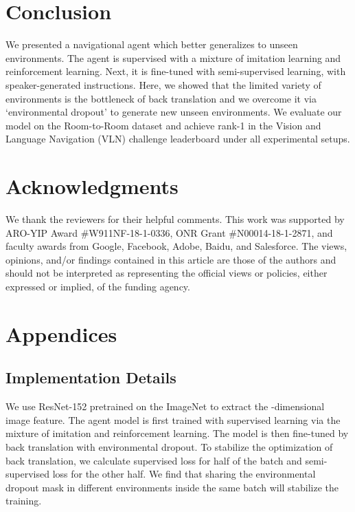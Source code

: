 \documentclass[11pt,a4paper]{article}
\begin{document}
\section{Conclusion}
We presented a navigational agent which better generalizes to unseen environments.
The agent is supervised with a mixture of imitation learning and reinforcement learning.
Next, it is fine-tuned with semi-supervised learning, with speaker-generated instructions. Here, we showed that the limited variety of environments is the bottleneck of back translation and we overcome it via `environmental dropout' to generate new unseen environments.
We evaluate our model on the Room-to-Room dataset and  achieve rank-1 in the Vision and Language Navigation (VLN) challenge leaderboard under all experimental setups. 


\section*{Acknowledgments}
We thank the reviewers for their helpful comments. 
This work was supported by ARO-YIP Award \#W911NF-18-1-0336, ONR Grant \#N00014-18-1-2871, and faculty awards from Google, Facebook, Adobe, Baidu, and Salesforce. The views, opinions, and/or findings contained in this article are those of the authors and should not be interpreted as representing the official views or policies, either expressed or implied, of the funding agency.




\appendix

\section{Appendices}
\subsection{Implementation Details}
We use ResNet-152 \cite{he2016deep} pretrained on the ImageNet \cite{russakovsky2015imagenet} to extract the -dimensional image feature. 
The agent model is first trained with supervised learning via the mixture of imitation and reinforcement learning. 
The model is then fine-tuned by back translation with environmental dropout. 
To stabilize the optimization of back translation, we calculate supervised loss for half of the batch and semi-supervised loss for the other half.
We find that sharing the environmental dropout mask in different environments inside the same batch will stabilize the training.
\end{document}
